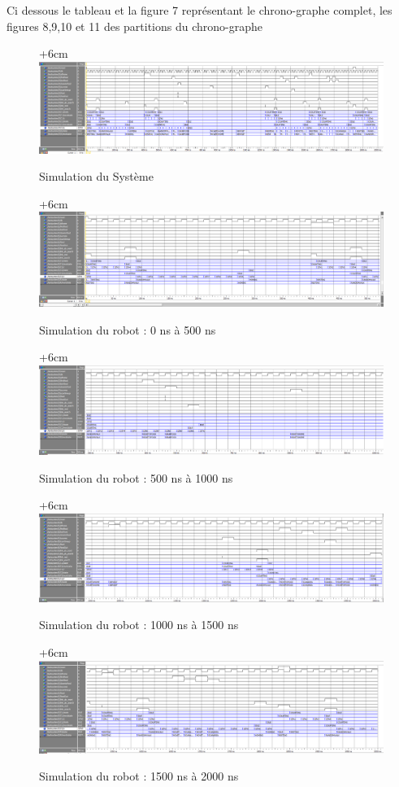 \documentclass{article}
\begin{document}
Ci dessous le tableau et la figure 7 représentant le chrono-graphe complet, les figures 8,9,10 et 11 des partitions du chrono-graphe






\begin{figure}[!h]
\advance\leftskip+6cm
\includegraphics[scale=0.50, angle=-90]{TestSystem.PNG}
\caption{Simulation du Système}
\end{figure}

\begin{figure}[!h]
\advance\leftskip+6cm
\includegraphics[scale=0.50, angle=-90]{System_detail_part1.PNG}
\caption{Simulation du robot : 0 ns à 500 ns}
\end{figure}

\begin{figure}[!h]
\advance\leftskip+6cm
\includegraphics[scale=0.50, angle=-90]{System_detail_part2.PNG}
\caption{Simulation du robot : 500 ns à 1000 ns}
\end{figure}

\begin{figure}[!h]
\advance\leftskip+6cm
\includegraphics[scale=0.50, angle=-90]{System_detail_part3.PNG}
\caption{Simulation du robot : 1000 ns à 1500 ns}
\end{figure}

\begin{figure}[!h]
\advance\leftskip+6cm
\includegraphics[scale=0.50, angle=-90]{System_detail_part4.PNG}
\caption{Simulation du robot : 1500 ns à 2000 ns}
\end{figure}
\end{document}
